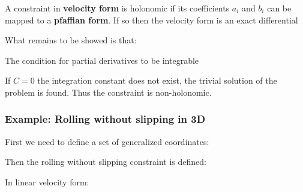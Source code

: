 \documentclass[10pt,a4paper]{scrartcl}
\begin{document}
\begin{multicols*}{2}
A constraint in \textbf{velocity form} is holonomic if its coefficients $a_i$ and $b_i$ can be mapped to a \textbf{pfaffian form}. If so then the velocity form is an exact differential


What remains to be showed is that:


The condition for partial derivatives to be integrable


If $C=0$ the integration constant does not exist, the trivial solution of the problem is found. Thus the constraint is non-holonomic.

\subsubsection{Example: Rolling without slipping in 3D}


First we need to define a set of generalized coordinates:


Then the rolling without slipping constraint is defined:


In linear velocity form:



\end{multicols*}
\end{document}

